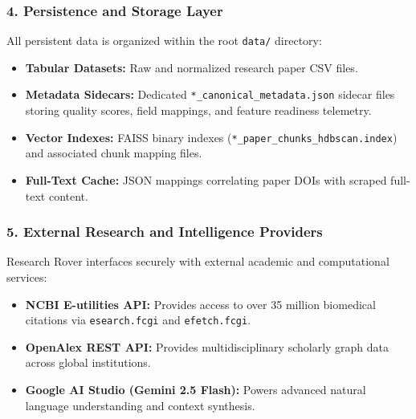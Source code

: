\subsubsection{4. Persistence and Storage Layer}
All persistent data is organized within the root \texttt{data/} directory:
\begin{itemize}
    \item \textbf{Tabular Datasets:} Raw and normalized research paper CSV files.
    \item \textbf{Metadata Sidecars:} Dedicated \texttt{*\_canonical\_metadata.json} sidecar files storing quality scores, field mappings, and feature readiness telemetry.
    \item \textbf{Vector Indexes:} FAISS binary indexes (\texttt{*\_paper\_chunks\_hdbscan.index}) and associated chunk mapping files.
    \item \textbf{Full-Text Cache:} JSON mappings correlating paper DOIs with scraped full-text content.
\end{itemize}

\subsubsection{5. External Research and Intelligence Providers}
Research Rover interfaces securely with external academic and computational services:
\begin{itemize}
    \item \textbf{NCBI E-utilities API:} Provides access to over 35 million biomedical citations via \texttt{esearch.fcgi} and \texttt{efetch.fcgi}.
    \item \textbf{OpenAlex REST API:} Provides multidisciplinary scholarly graph data across global institutions.
    \item \textbf{Google AI Studio (Gemini 2.5 Flash):} Powers advanced natural language understanding and context synthesis.
\end{itemize}
